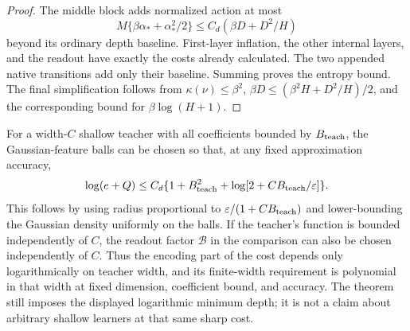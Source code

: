 \begin{proof}
The middle block adds normalized action at most
\[
 M\{\beta\alpha_*+\alpha_*^2/2\}
 \le C_d(\beta D+D^2/H)
\]
beyond its ordinary depth baseline. First-layer inflation, the other internal layers, and the readout have exactly the costs already calculated. The two appended native transitions add only their baseline. Summing proves the entropy bound. The final simplification follows from $\kappa(\nu)\le\beta^2$, $\beta D\le(\beta^2H+D^2/H)/2$, and the corresponding bound for $\beta\log(H+1)$.
\end{proof}

For a width-$C$ shallow teacher with all coefficients bounded by $B_{\rm teach}$, the Gaussian-feature balls can be chosen so that, at any fixed approximation accuracy,
\[
 \log(e+Q)\le C_d\{1+B_{\rm teach}^2+
                   \log[2+C B_{\rm teach}/\varepsilon]\}.
\]
This follows by using radius proportional to $\varepsilon/(1+C B_{\rm teach})$ and lower-bounding the Gaussian density uniformly on the balls. If the teacher's function is bounded independently of $C$, the readout factor $\mathcal B$ in the comparison can also be chosen independently of $C$. Thus the encoding part of the cost depends only logarithmically on teacher width, and its finite-width requirement is polynomial in that width at fixed dimension, coefficient bound, and accuracy. The theorem still imposes the displayed logarithmic minimum depth; it is not a claim about arbitrary shallow learners at that same sharp cost.
